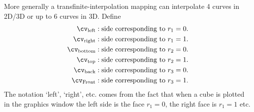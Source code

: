 \newcommand{\cvLeft}{\cv_{\rm left}}
\newcommand{\cvRight}{\cv_{\rm right}}
\newcommand{\cvBottom}{\cv_{\rm bottom}}
\newcommand{\cvTop}{\cv_{\rm top}}
\newcommand{\cvBack}{\cv_{\rm back}}
\newcommand{\cvFront}{\cv_{\rm Front}}
More generally a transfinite-interpolation mapping can interpolate 4 curves in 2D/3D or up to 6 curves in 3D.
Define
\begin{align*}
  \cvLeft    & :  \mbox{side corresponding to $r_1=0$.}  \\
  \cvRight   & :  \mbox{side corresponding to $r_1=1$.}  \\
  \cvBottom  & :  \mbox{side corresponding to $r_2=0$.}  \\
  \cvTop     & :  \mbox{side corresponding to $r_2=1$.}  \\
  \cvBack    & :  \mbox{side corresponding to $r_3=0$.}  \\
  \cvFront   & :  \mbox{side corresponding to $r_3=1$.}
\end{align*}
The notation `left', `right', etc. comes from the fact that when a cube is plotted in the graphics window
the left side is the face $r_1=0$, the right face is $r_1=1$ etc.

